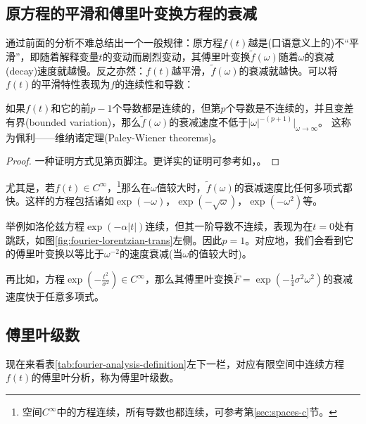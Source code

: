 \subsection{原方程的平滑和傅里叶变换方程的衰减}
\label{sec:fourier-smoothness-decay}
通过前面的分析不难总结出一个一般规律：原方程$f(t)$越是(口语意义上的)不``平滑''，即随着解释变量$t$的变动而剧烈变动，其傅里叶变换$\tilde{f} \left( \omega \right)$随着$\omega$的衰减(decay)速度就越慢。反之亦然：$f(t)$越平滑，$\tilde{f} \left( \omega \right)$的衰减就越快。可以将$f(t)$的平滑特性表现为$f$的连续性和导数：
\begin{theorem}[佩利——维纳诸定理]
  \label{theorem:paley-wiener-theorems}
  如果$f(t)$和它的前$p-1$个导数都是连续的，但第$p$个导数是不连续的，并且变差有界(bounded variation)，那么$\tilde{f}(\omega)$的衰减速度不低于$\left| \omega \right|^{- \left( p + 1 \right)} \big|_{\omega \rightarrow \infty}$。  这称为佩利——维纳诸定理(Paley-Wiener theorems)。
\end{theorem}
\begin{proof}
  一种证明方式见第\pageref{eq:ninc-cc-trape-fsynthesis-coef-boyd}页脚注。更详实的证明可参考如\cite[Sec. VI.4]{Yosida:1978ul}，\cite[Theorem 4.1.2]{Agranovich:2015cv}。
\end{proof}

  尤其是，若$f(t) \in C^{\infty}$，\footnote{空间$C^{\infty}$中的方程连续，所有导数也都连续，可参考第\ref{sec:spaces-c}节。}那么在$\omega$值较大时，$\tilde{f}(\omega)$的衰减速度比任何多项式都快。这样的方程包括诸如$\exp \left( - \omega \right)$，$\exp \left( - \sqrt{\omega} \right)$，$\exp \left( - \omega^{2} \right)$等。

举例如洛伦兹方程$\exp \left( - \alpha \left| t \right| \right)$连续，但其一阶导数不连续，表现为在$t=0$处有跳跃，如图\ref{fig:fourier-lorentzian-trans}左侧。因此$p=1$。对应地，我们会看到它的傅里叶变换以等比于$\omega^{-2}$的速度衰减(当$\omega$的值较大时)。

再比如，方程$\exp \left( - \frac{t^{2}}{\sigma^{2}} \right) \in C^{\infty}$，那么其傅里叶变换$\widetilde{F} = \exp \left( - \frac{1}{4} \sigma^{2} \omega^{2} \right)$的衰减速度快于任意多项式。

\subsection{傅里叶级数}
\label{sec:fourier-seires}
现在来看表\ref{tab:fourier-analysis-definition}左下一栏，对应有限空间中连续方程$f(t)$的傅里叶分析，称为傅里叶级数。

